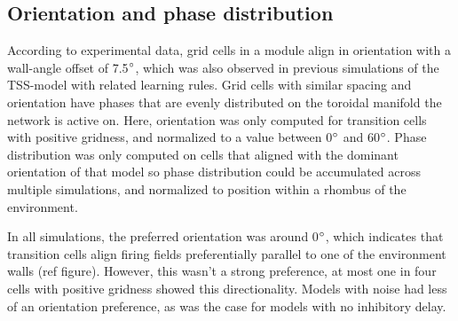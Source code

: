\documentclass{article}
\begin{document}
    \subsection{Orientation and phase distribution} \label{OrientationPhaseResults}

    According to experimental data, grid cells in a module align in orientation with a wall-angle offset of 7.5\(\degree\), which was also observed in previous simulations of the TSS-model with related learning rules. Grid cells with similar spacing and orientation have phases that are evenly distributed on the toroidal manifold the network is active on. Here, orientation was only computed for transition cells with positive gridness, and normalized to a value between 0\(\degree\) and 60\(\degree\). Phase distribution was only computed on cells that aligned with the dominant orientation of that model so phase distribution could be accumulated across multiple simulations, and normalized to position within a rhombus of the environment.

    In all simulations, the preferred orientation was around 0\(\degree\), which indicates that transition cells align firing fields preferentially parallel to one of the environment walls (ref figure). However, this wasn't a strong preference, at most one in four cells with positive gridness showed this directionality. Models with noise had less of an orientation preference, as was the case for models with no inhibitory delay. 
    
\end{document}
